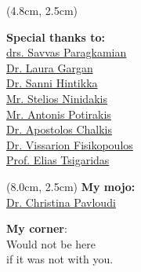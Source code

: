 \documentclass{beamer}
\begin{document}
\begin{darkframes}
\begin{frame}


      \begin{textblock*}{4.0cm}(4.8cm, 2.5cm)

         \footnotesize \textbf{Special thanks to:} \\

         \footnotesize \href{https://imbbc.hcmr.gr/user/s-paragkamian/}{drs. Savvas Paragkamian} \\
         \footnotesize \href{https://sites.google.com/view/lab-area52/home/meet-the-team?authuser=0}{Dr. Laura Gargan} \\
         \footnotesize \href{https://www.researchgate.net/profile/Sanni-Hintikka}{Dr. Sanni Hintikka} \\
         \footnotesize \href{https://imbbc.hcmr.gr/user/sninidakis/}{Mr. Stelios Ninidakis} \\
         \footnotesize \href{https://imbbc.hcmr.gr/user/potant/}{Mr. Antonis Potirakis} \\
         \footnotesize \href{https://tolischal.github.io/}{Dr. Apostolos Chalkis} \\
         \footnotesize \href{https://vissarion.github.io/}{Dr. Vissarion Fisikopoulos} \\ 
         \footnotesize \href{https://who.paris.inria.fr/Elias.Tsigaridas/}{Prof. Elias Tsigaridas} \\
         
      \end{textblock*}

      \begin{textblock*}{4.0cm}(8.0cm, 2.5cm)
         \footnotesize
         \textbf{My mojo:}\\
         \footnotesize 
         \href{https://cpavloud.github.io/mysite/projects/}{Dr. Christina Pavloudi} \\ 

         \bigskip 

         \textbf{My corner}: \\

            Would not be here \\
            if it was not with you.
         
      \end{textblock*}



\end{frame}
\end{darkframes}
\end{document}
